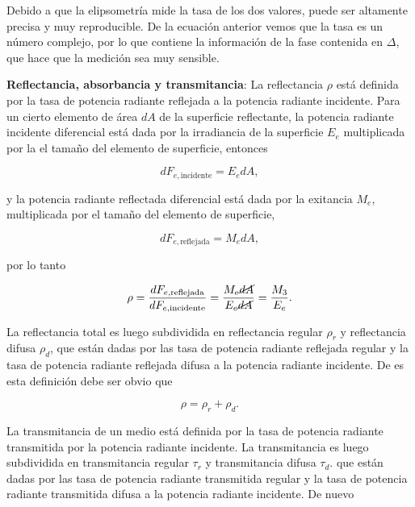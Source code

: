 \documentclass[a4paper,11pt]{article}
\numberwithin{equation}{section}
\begin{document}
Debido a que la elipsometría mide la tasa de los dos valores, puede ser altamente 
precisa y muy reproducible. De la ecuación anterior vemos que la tasa es un 
número complejo, por lo que contiene la información de la fase contenida en $\Delta$, 
que hace que la medición sea muy sensible. 

\vspace{.3cm}

\textbf{Reflectancia, absorbancia y transmitancia}: La reflectancia $\rho$ está definida 
por la tasa de potencia radiante reflejada a la potencia radiante incidente. Para 
un cierto elemento de área $dA$ de la superficie reflectante, la potencia 
radiante incidente diferencial está dada por la irradiancia de la superficie 
$E_e$ multiplicada por la el tamaño del elemento de superficie, entonces 

\begin{equation}
 dF_{e,\text{incidente}} = E_e dA,
\end{equation}

y la potencia radiante reflectada diferencial está dada por la exitancia $M_e$, 
multiplicada por el tamaño del elemento de superficie, 

\begin{equation}
 dF_{e,\text{reflejada}} = M_e dA,
\end{equation}

por lo tanto 

\begin{equation}
 \rho = \frac{dF_{e,\text{reflejada}}}{dF_{e,\text{incidente}}} = 
 \frac{M_e \cancel{dA}}{E_e \cancel{dA}} = \frac{M_3}{E_e}.
\end{equation}

La reflectancia total es luego subdividida en reflectancia regular $\rho_r$ y 
reflectancia difusa $\rho_d$, que están dadas por las tasa de potencia radiante 
reflejada regular y la tasa de potencia radiante reflejada difusa a la potencia 
radiante incidente. De es esta definición debe ser obvio que 

\begin{equation}
 \rho =  \rho_r + \rho_d.
\end{equation}

La transmitancia de un medio está definida por la tasa de potencia radiante transmitida 
por la potencia radiante incidente. La transmitancia es luego subdividida en 
transmitancia regular $\tau_r$ y transmitancia difusa $\tau_d$. que están dadas por 
las tasa de potencia radiante transmitida regular y la tasa de potencia
radiante transmitida difusa a la potencia radiante incidente. De nuevo 
\end{document}
